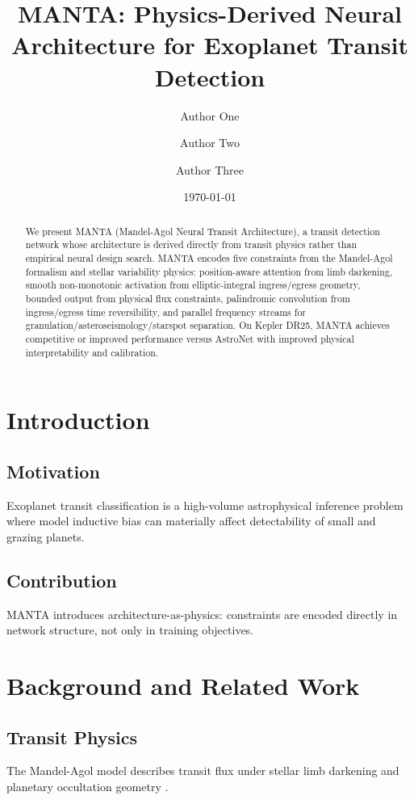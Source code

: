 \documentclass[11pt]{article}
\title{MANTA: Physics-Derived Neural Architecture for Exoplanet Transit Detection}
\author{Author One \and Author Two \and Author Three}
\date{\today}
\begin{document}
\maketitle

\begin{abstract}
We present MANTA (Mandel-Agol Neural Transit Architecture), a transit detection
network whose architecture is derived directly from transit physics rather than
empirical neural design search. MANTA encodes five constraints from the
Mandel-Agol formalism and stellar variability physics: position-aware attention
from limb darkening, smooth non-monotonic activation from elliptic-integral
ingress/egress geometry, bounded output from physical flux constraints,
palindromic convolution from ingress/egress time reversibility, and parallel
frequency streams for granulation/asteroseismology/starspot separation. On
Kepler DR25, MANTA achieves competitive or improved performance versus AstroNet
with improved physical interpretability and calibration.
\end{abstract}

\section{Introduction}
\subsection{Motivation}
Exoplanet transit classification is a high-volume astrophysical inference
problem where model inductive bias can materially affect detectability of small
and grazing planets.

\subsection{Contribution}
MANTA introduces architecture-as-physics: constraints are encoded directly in
network structure, not only in training objectives.

\section{Background and Related Work}
\subsection{Transit Physics}
The Mandel-Agol model describes transit flux under stellar limb darkening and
planetary occultation geometry \citep{mandelagol2002}.
\end{document}
